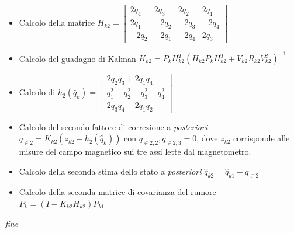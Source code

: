 \begin{itemize}
	\item Calcolo della matrice $H_{k2} = \begin{bmatrix}
	2q_4 & 2q_3 & 2q_2 & 2q_1  \\
	2q_1 & -2q_2 & -2q_3 & -2q_4\\
	-2q_2 & -2q_1 & -2q_4 & 2q_3
	\end{bmatrix} $
	\item Calcolo del guadagno di Kalman $K_{k2} = P_k H_{k2}^T (H_{k2}P_k H_{k2}^T + V_{k2}R_{k2}V_{k2}^T)^{-1}$
	\item Calcolo di $h_2(\hat{q}_k) = \begin{bmatrix}
	2q_2q_3 + 2q_1q_4 \\
	q_1^2 - q_2^2 - q_3^2 - q_4^2 \\
	2q_3q_4 - 2q_1q_2
	\end{bmatrix} $
	\item Calcolo del secondo fattore di correzione a \textit{posteriori} $q_{\in2} = K_{k2}(z_{k2} - h_2(\hat{q}_k))$ con $ q_{\in2,2},q_{\in2,3} = 0$, dove $z_{k2}$ corrisponde alle misure del campo magnetico sui tre assi lette dal magnetometro.
	\item Calcolo della seconda stima dello stato a \textit{posteriori}   $\hat{q}_{k2}= \hat{q}_{k1} + q_{\in2}$
	\item Calcolo della seconda matrice di covarianza del rumore  $P_k = (I - K_{k2}H_{k2})P_{k1}$
\end{itemize}
\textit{fine }

